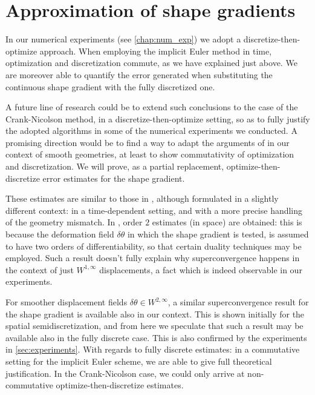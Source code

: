 \documentclass[english,a4paper,10pt,oneside]{scrbook}	%
\theoremstyle{break}
\theoremstyle{remark}
\newcommand{\te}{\theta}
\begin{document}
\section{Approximation of shape gradients}
\label{sec:d-t-o_IE}

In our numerical experiments (see \cref{chap:num_exp}) we adopt a discretize-then-optimize approach. When employing the implicit Euler method in time, optimization and discretization commute, as we have explained just above. We are moreover able to quantify the error generated when substituting the continuous shape gradient with the fully discretized one. 

A future line of research could be to extend such conclusions to the case of the Crank-Nicolson method, in a discretize-then-optimize setting, so as to fully justify the adopted algorithms in some of the numerical experiments we conducted. A promising direction would be to find a way to adapt the arguments of \cite{flaig} in our context of smooth geometries, at least to show commutativity of optimization and discretization. We will prove, as a partial replacement, optimize-then-discretize error estimates for the shape gradient.

These estimates are similar to those in \cite{paganini}, although formulated in a slightly different context: in a time-dependent setting, and with a more precise handling of the geometry mismatch. In \cite{paganini}, order $2$ estimates (in space) are obtained: this is because the deformation field $\delta \te$  in which the shape gradient is tested, is assumed to have two orders of differentiability, so that certain duality techniques may be employed. Such a result doesn't fully explain why superconvergence happens in the context of just $W^{1,\infty}$ displacements, a fact which is indeed observable in our experiments.

For smoother displacement fields $\delta \te\in W^{2,\infty}$, a similar superconvergence result for the shape gradient is available also in our context. This is shown initially for the spatial semidiscretization, and from here we speculate that such a result may be available also in the fully discrete case. This is also confirmed by the experiments in \cref{sec:experiments}. With regards to fully discrete estimates: in a commutative setting for the implicit Euler scheme, we are able to give full theoretical justification. In the Crank-Nicolson case, we could only arrive at non-commutative optimize-then-discretize estimates.

\end{document}
